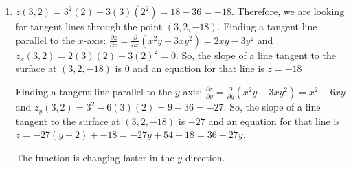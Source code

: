\begin{Answer}[ref = tangent]
\begin{enumerate}
    The function is changing faster in the $y$-direction.

    \item $z(3, 2) = 3^2(2) - 3(3)(2^2) = 18 - 36 = -18$. Therefore, we are 
    looking for tangent lines through the point $(3, 2, -18)$. Finding a 
    tangent line parallel to the $x$-axis: $\frac{\partial z}{\partial x} = 
    \frac{\partial}{\partial x} \left( x^2y - 3xy^2 \right) = 2xy - 3y^2$ and 
    $z_x(3, 2) = 2(3)(2) - 3(2)^2 = 0$. So, the slope of a line tangent to the 
    surface at $(3, 2, -18)$ is $0$ and an equation for that line is $z = -18$

    Finding a tangent line parallel to the $y$-axis: $\frac{\partial z}{
    \partial y} = \frac{\partial}{\partial y} \left( x^2y - 3xy^2 \right) = 
    x^2 - 6xy$ and $z_y(3, 2) = 3^2 - 6(3)(2) = 9 - 36 = -27$. So, the slope of 
    a line tangent to the surface at $(3, 2, -18)$ is $-27$ and an equation for
    that line is $z = -27(y - 2) + -18 = -27y + 54 - 18 = 36 - 27y$.

    The function is changing faster in the $y$-direction. 
\end{enumerate}
\end{Answer}
